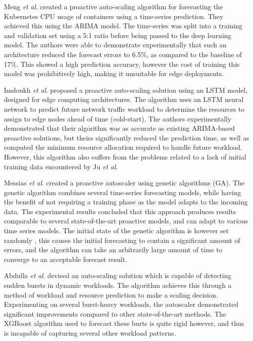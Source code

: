 Meng \textit{et al}. \cite{meng2016crupa} created a proactive auto-scaling algorithm for forecasting the Kubernetes CPU usage of containers using a time-series prediction. They achieved this using the ARIMA model. The time-series was split into a training and validation set using a 5:1 ratio before being passed to the deep learning model. The authors were able to demonstrate experimentally that such an architecture reduced the forecast errors to 6.5\%, as compared to the baseline of 17\%. This showed a high prediction accuracy, however the cost of training this model was prohibitively high, making it unsuitable for edge deployments.\par

Imdoukh \textit{et al}. \cite{imdoukh2020machine} proposed a proactive auto-scaling solution using an LSTM model, designed for edge computing architectures. The algorithm uses an LSTM neural network to predict future network traffic workload to determine the resources to assign to edge nodes ahead of time (cold-start). The authors experimentally demonstrated that their algorithm was as accurate as existing ARIMA-based proactive solutions, but theirs significantly reduced the prediction time, as well as computed the minimum resource allocation required to handle future workload. However, this algorithm also suffers from the problems related to a lack of initial training data encountered by Ju \textit{et al}. \cite{ju2021proactive}\par

Messias \textit{et al}. \cite{messias2016combining} created a proactive autoscaler using genetic algorithms (GA). The genetic algorithm combines several time-series forecasting models, while having the benefit of not requiring a training phase as the model adapts to the incoming data. The experimental results concluded that this approach produces results comparable to several state-of-the-art proactive models, and can adapt to various time series models. The initial state of the genetic algorithm is however set randomly \cite{lambora2019genetic}, this causes the initial forecasting to contain a significant amount of errors, and the algorithm can take an arbitrarily large amount of time to converge to an acceptable forecast result.\par

Abdulla \textit{et al}. \cite{abdullah2020burst} devised an auto-scaling solution which is capable of detecting sudden bursts in dynamic workloads. The algorithm achieves this through a method of workload and resource prediction to make a scaling decision. Experimenting on several burst-heavy workloads, the autoscaler demonstrated significant improvements compared to other state-of-the-art methods. The XGBoost algorithm used to forecast these burts is quite rigid however, and thus is incapable of capturing several other workload patterns.\par

